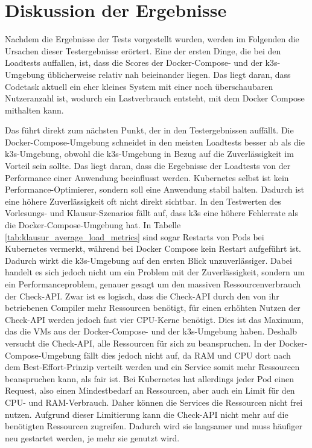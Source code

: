 \section{Diskussion der Ergebnisse}
Nachdem die Ergebnisse der Tests vorgestellt wurden, werden im Folgenden die Ursachen dieser Testergebnisse erörtert.
Eine der ersten Dinge, die bei den Loadtests auffallen, ist, dass die Scores der Docker-Compose- und der k3s-Umgebung üblicherweise relativ nah beieinander liegen.
Das liegt daran, dass Codetask aktuell ein eher kleines System mit einer noch überschaubaren Nutzeranzahl ist, wodurch ein Lastverbrauch entsteht, mit dem Docker Compose mithalten kann.

Das führt direkt zum nächsten Punkt, der in den Testergebnissen auffällt. 
Die Docker-Compose-Umgebung schneidet in den meisten Loadtests besser ab als die k3s-Umgebung, obwohl die k3s-Umgebung in Bezug auf die Zuverlässigkeit im Vorteil sein sollte.
Das liegt daran, dass die Ergebnisse der Loadtests von der Performance einer Anwendung beeinflusst werden.
Kubernetes selbst ist kein Performance-Optimierer, sondern soll eine Anwendung stabil halten. Dadurch ist eine höhere Zuverlässigkeit oft nicht direkt sichtbar.
In den Testwerten des Vorlesungs- und Klausur-Szenarios fällt auf, dass k3s eine höhere Fehlerrate als die Docker-Compose-Umgebung hat.
In Tabelle \ref{tab:klausur_average_load_metrics} sind sogar Restarts von Pods bei Kubernetes vermerkt, während bei Docker Compose kein Restart aufgeführt ist.
Dadurch wirkt die k3s-Umgebung auf den ersten Blick unzuverlässiger. Dabei handelt es sich jedoch nicht um ein Problem mit der Zuverlässigkeit, sondern um ein Performanceproblem, genauer gesagt um den massiven Ressourcenverbrauch der Check-API.
Zwar ist es logisch, dass die Check-API durch den von ihr betriebenen Compiler mehr Ressourcen benötigt, für einen erhöhten Nutzen der Check-API werden jedoch fast vier CPU-Kerne benötigt.
Dies ist das Maximum, das die VMs aus der Docker-Compose- und der k3s-Umgebung haben. Deshalb versucht die Check-API, alle Ressourcen für sich zu beanspruchen.
In der Docker-Compose-Umgebung fällt dies jedoch nicht auf, da RAM und CPU dort nach dem Best-Effort-Prinzip verteilt werden und ein Service somit mehr Ressourcen beanspruchen kann, als fair ist.
Bei Kubernetes hat allerdings jeder Pod einen Request, also einen Mindestbedarf an Ressourcen, aber auch ein Limit für den CPU- und RAM-Verbrauch. 
Daher können die Services die Ressourcen nicht frei nutzen.
Aufgrund dieser Limitierung kann die Check-API nicht mehr auf die benötigten Ressourcen zugreifen. Dadurch wird sie langsamer und muss häufiger neu gestartet werden, je mehr sie genutzt wird.
